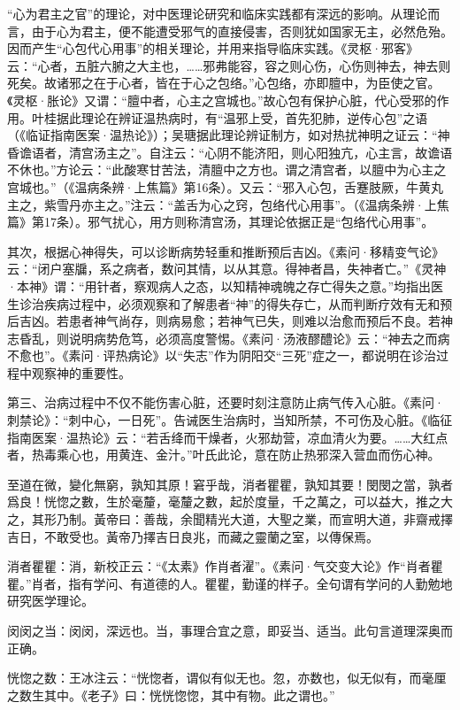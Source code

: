 \documentclass[12pt]{ctexbook}
\begin{document}
“心为君主之官”的理论，对中医理论研究和临床实践都有深远的影响。从理论而言，由于心为君主，便不能遭受邪气的直接侵害，否则犹如国家无主，必然危殆。因而产生“心包代心用事”的相关理论，并用来指导临床实践。《灵枢·邪客》云：“心者，五脏六腑之大主也，……邪弗能容，容之则心伤，心伤则神去，神去则死矣。故诸邪之在于心者，皆在于心之包络。”心包络，亦即膻中，为臣使之官。《灵枢·胀论》又谓：“膻中者，心主之宫城也。”故心包有保护心脏，代心受邪的作用。叶桂据此理论在辨证温热病时，有“温邪上受，首先犯肺，逆传心包”之语（《临证指南医案·温热论》）；吴瑭据此理论辨证制方，如对热扰神明之证云：“神昏谵语者，清宫汤主之”。自注云：“心阴不能济阳，则心阳独亢，心主言，故谵语不休也。”方论云：“此酸寒甘苦法，清膻中之方也。谓之清宫者，以膻中为心主之宫城也。”（《温病条辨·上焦篇》第16条）。又云：“邪入心包，舌蹇肢厥，牛黄丸主之，紫雪丹亦主之。”注云：“盖舌为心之窍，包络代心用事”。（《温病条辨·上焦篇》第17条）。邪气扰心，用方则称清宫汤，其理论依据正是“包络代心用事”。

其次，根据心神得失，可以诊断病势轻重和推断预后吉凶。《素问·移精变气论》云：“闭户塞牖，系之病者，数问其情，以从其意。得神者昌，失神者亡。”《灵神·本神》谓：“用针者，察观病人之态，以知精神魂魄之存亡得失之意。”均指出医生诊治疾病过程中，必须观察和了解患者“神”的得失存亡，从而判断疗效有无和预后吉凶。若患者神气尚存，则病易愈；若神气已失，则难以治愈而预后不良。若神志昏乱，则说明病势危笃，必须高度警惕。《素问·汤液醪醴论》云：“神去之而病不愈也”。《素问·评热病论》以“失志”作为阴阳交“三死”症之一，都说明在诊治过程中观察神的重要性。

第三、治病过程中不仅不能伤害心脏，还要时刻注意防止病气传入心脏。《素问·刺禁论》：“刺中心，一日死”。告诫医生治病时，当知所禁，不可伤及心脏。《临征指南医案·温热论》云：“若舌绛而干燥者，火邪劫营，凉血清火为要。……大红点者，热毒乘心也，用黄连、金汁。”叶氏此论，意在防止热邪深入营血而伤心神。


\begin{yuanwen}
至道在微，變化無窮，孰知其原！窘乎哉，消者瞿瞿，孰知其要！閔閔之當，孰者爲良！恍惚之數，生於毫釐，毫釐之數，起於度量，千之萬之，可以益大，推之大之，其形乃制。黃帝曰：善哉，余聞精光大道，大聖之業，而宣明大道，非齋戒擇吉日，不敢受也。黃帝乃擇吉日良兆，而藏之靈蘭之室，以傳保焉。
\end{yuanwen}


\begin{jiaozhu}
  \item 消者瞿瞿：消，新校正云：“《太素》作肖者濯”。《素问·气交变大论》作“肖者瞿瞿。”肖者，指有学问、有道德的人。瞿瞿，勤谨的样子。全句谓有学问的人勤勉地研究医学理论。
  \item 闵闵之当：闵闵，深远也。当，事理合宜之意，即妥当、适当。此句言道理深奥而正确。
  \item 恍惚之数：王冰注云：“恍惚者，谓似有似无也。忽，亦数也，似无似有，而毫厘之数生其中。《老子》曰：恍恍惚惚，其中有物。此之谓也。”
\end{jiaozhu}
\end{document}
